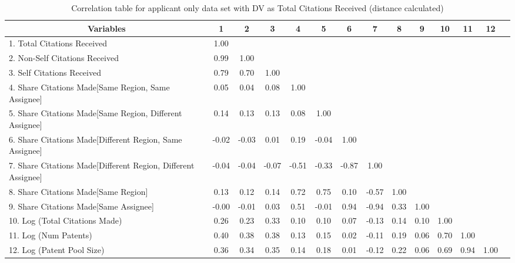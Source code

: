 \begin{table}[htbp]\centering \caption{Correlation table for applicant only data set with DV as Total Citations Received (distance calculated)\label{a.tcorrelation}}
\footnotesize
\singlespacing
\begin{adjustbox}{angle=90}
\begin{tabular}{l  c  c  c  c  c  c  c  c  c  c  c  c  c }\hline\hline
\multicolumn{1}{c}{Variables} &1&2&3&4&5&6&7&8&9&10&11&12\\ \hline
1. Total Citations Received&1.00\\
2. Non-Self Citations Received&0.99&1.00\\
3. Self Citations Received&0.79&0.70&1.00\\
4. Share Citations Made[Same Region, Same Assignee]&0.05&0.04&0.08&1.00\\
5. Share Citations Made[Same Region, Different Assignee]&0.14&0.13&0.13&0.08&1.00\\
6. Share Citations Made[Different Region, Same Assignee]&-0.02&-0.03&0.01&0.19&-0.04&1.00\\
7. Share Citations Made[Different Region, Different Assignee]&-0.04&-0.04&-0.07&-0.51&-0.33&-0.87&1.00\\
8. Share Citations Made[Same Region]&0.13&0.12&0.14&0.72&0.75&0.10&-0.57&1.00\\
9. Share Citations Made[Same Assignee]&-0.00&-0.01&0.03&0.51&-0.01&0.94&-0.94&0.33&1.00\\
10. Log (Total Citations Made)&0.26&0.23&0.33&0.10&0.10&0.07&-0.13&0.14&0.10&1.00\\
11. Log (Num Patents)&0.40&0.38&0.38&0.13&0.15&0.02&-0.11&0.19&0.06&0.70&1.00\\
12. Log (Patent Pool Size)&0.36&0.34&0.35&0.14&0.18&0.01&-0.12&0.22&0.06&0.69&0.94&1.00\\
\hline \hline 
 \end{tabular}
 \end{adjustbox}
\end{table}
